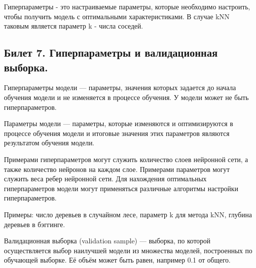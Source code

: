 \documentclass[a4paper, 12pt]{article}
\begin{document}
	Гиперпараметры - это настраиваемые параметры, которые необходимо настроить, чтобы получить модель с оптимальными характеристиками. В случае kNN таковым является параметр k - числа соседей.
	\subsection*{Билет 7. Гиперпараметры и валидационная выборка.}
	Гиперпараметры модели — параметры, значения которых задается до начала обучения модели и не изменяется в процессе обучения. У модели может не быть гиперпараметров.
	
	Параметры модели — параметры, которые изменяются и оптимизируются в процессе обучения модели и итоговые значения этих параметров являются результатом обучения модели.
	
	Примерами гиперпараметров могут служить количество слоев нейронной сети, а также количество нейронов на каждом слое. Примерами параметров могут служить веса ребер нейронной сети.
	Для нахождения оптимальных гиперпараметров модели могут применяться различные алгоритмы настройки гиперпараметров.
	
	Примеры: число деревьев в случайном лесе, параметр k для метода kNN, глубина деревьев в бэггинге.
	
	Валидационная выборка (validation sample) — выборка, по которой осуществляется выбор наилучшей модели из множества моделей, построенных по обучающей выборке. Её объём может быть равен, например 0.1 от общего.
\end{document}
